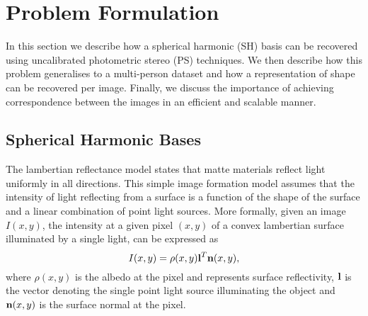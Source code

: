 \section{Problem Formulation}\label{sec:problem}
In this section we describe how a spherical harmonic (SH) basis can be recovered
using uncalibrated photometric stereo (PS) techniques. We then describe how this
problem generalises to a multi-person dataset and how a representation of shape
can be recovered per image. Finally, we discuss the importance of achieving
correspondence between the images in an efficient and scalable manner.
\subsection{Spherical Harmonic Bases}\label{subsec:spherical_harmonic}
The lambertian reflectance model states that matte materials reflect light
uniformly in all directions. This simple image formation model assumes that the
intensity of light reflecting from a surface is a function of the shape of the
surface and a linear combination of point light sources. More formally, given an
image $I(x, y)$, the intensity at a given pixel $(x, y)$ of a convex lambertian
surface illuminated by a single light, can be expressed as
\begin{equation}\label{eq:lambert_law}
    I(x, y) = \rho(x, y) \boldsymbol{\mathbf{l}}^T \boldsymbol{\mathbf{n}}(x, y),
\end{equation}
where $\rho(x, y)$ is the albedo at the pixel and represents surface
reflectivity, $\boldsymbol{\mathbf{l}}$ is the vector denoting the single point light source
illuminating the object and $\boldsymbol{\mathbf{n}}(x, y)$ is the surface normal at the
pixel.

